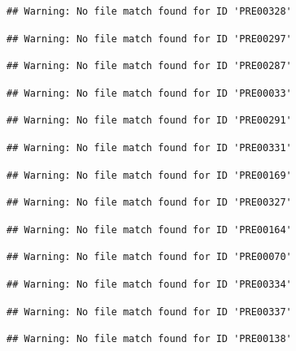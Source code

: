 \documentclass[
]{book}
\theoremstyle{definition}
\theoremstyle{definition}
\theoremstyle{definition}
\theoremstyle{definition}
\theoremstyle{remark}
\begin{document}
\begin{verbatim}
## Warning: No file match found for ID 'PRE00328'
\end{verbatim}

\begin{verbatim}
## Warning: No file match found for ID 'PRE00297'
\end{verbatim}

\begin{verbatim}
## Warning: No file match found for ID 'PRE00287'
\end{verbatim}

\begin{verbatim}
## Warning: No file match found for ID 'PRE00033'
\end{verbatim}

\begin{verbatim}
## Warning: No file match found for ID 'PRE00291'
\end{verbatim}

\begin{verbatim}
## Warning: No file match found for ID 'PRE00331'
\end{verbatim}

\begin{verbatim}
## Warning: No file match found for ID 'PRE00169'
\end{verbatim}

\begin{verbatim}
## Warning: No file match found for ID 'PRE00327'
\end{verbatim}

\begin{verbatim}
## Warning: No file match found for ID 'PRE00164'
\end{verbatim}

\begin{verbatim}
## Warning: No file match found for ID 'PRE00070'
\end{verbatim}

\begin{verbatim}
## Warning: No file match found for ID 'PRE00334'
\end{verbatim}

\begin{verbatim}
## Warning: No file match found for ID 'PRE00337'
\end{verbatim}

\begin{verbatim}
## Warning: No file match found for ID 'PRE00138'
\end{verbatim}
\end{document}
